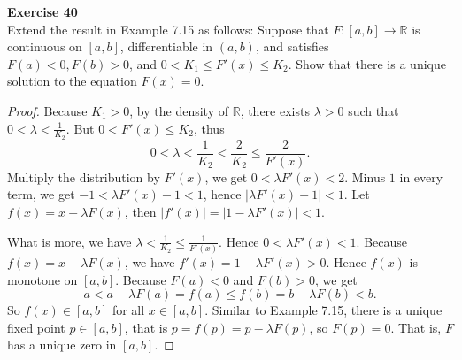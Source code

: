 \documentclass[12pt, a4paper]{article}
\theoremstyle{plain}
\newcommand{\R}{\mathbb{R}}
\newenvironment{exercise}[2][Exercise]
    { \begin{mdframed}[backgroundcolor=gray!20] \textbf{#1 #2} \\}
    {  \end{mdframed}}
\begin{document}
\pagebreak

\begin{exercise}{40}
Extend the result in Example 7.15 as follows: Suppose that $F:[a,b]\rightarrow \R$ is continuous on $[a,b]$, differentiable in $(a,b)$, and satisfies $F(a)<0, F(b)>0$, and $0<K_1\leq F'(x)\leq K_2$. Show that there is a unique solution to the equation $F(x)=0$.
\end{exercise}
	\begin{proof}
	Because $K_1>0$, by the density of $\R$, there exists $\lambda>0$ such that $0<\lambda <\frac{1}{K_2}$. But $0<F'(x)\leq K_2$, thus 
	\[
	0<\lambda <\frac{1}{K_2}<\frac{2}{K_2}\leq \frac{2}{F'(x)}.
	\]
	Multiply the distribution by $F'(x)$, we get $0<\lambda F'(x)<2$. Minus $1$ in every term, we get $-1<\lambda F'(x)-1< 1$, hence $|\lambda F'(x)-1|<1$. Let $f(x)=x-\lambda F(x)$, then $|f'(x)|=|1-\lambda F'(x)|<1$. 
	
	What is more, we have $\lambda<\frac{1}{K_2}\leq \frac{1}{F'(x)}$. Hence $0<\lambda F'(x)<1$. Because $f(x)=x-\lambda F(x)$, we have $f'(x)=1-\lambda F'(x)>0$. Hence $f(x)$ is monotone on $[a,b]$. Because $F(a)<0$ and $F(b)>0$, we get
	\[
	a<a-\lambda F(a)=f(a)\leq f(b)=b-\lambda F(b)<b.
	\]
	So $f(x)\in [a,b]$ for all $x\in [a,b]$. Similar to Example 7.15, there is a unique fixed point $p\in [a,b]$, that is $p=f(p)=p-\lambda F(p)$, so $F(p)=0$. That is, $F$ has a unique zero in $[a,b]$.
	\end{proof}
	
\end{document}
